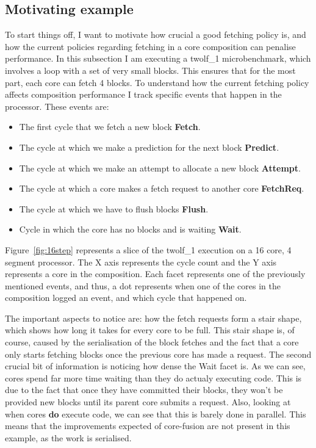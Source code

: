 \subsection{Motivating example}
To start things off, I want to motivate how crucial a good fetching policy is, and how the current policies regarding fetching in a core composition can penalise performance.
In this subsection I am executing a twolf\_1 microbenchmark, which involves a loop with a set of very small blocks. 
This ensures that for the most part, each core can fetch 4 blocks.
To understand how the current fetching policy affects composition performance I track specific events that happen in the processor.
These events are:
\begin{itemize}
\item The first cycle that we fetch a new block \textbf{Fetch}.
\item The cycle at which we make a prediction for the next block \textbf{Predict}.
\item The cycle at which we make an attempt to allocate a new block \textbf{Attempt}.
\item The cycle at which a core makes a fetch request to  another core \textbf{FetchReq}.
\item The cycle at which we have to flush blocks \textbf{Flush}.
\item Cycle in which the core has no blocks and is waiting \textbf{Wait}.
\end{itemize}
Figure~\ref{fig:16step} represents a slice of the twolf\_1 execution on a 16 core, 4 segment processor.
The X axis represents the cycle count and the Y axis represents a core in the composition.
Each facet represents one of the previously mentioned events, and thus, a dot represents when one of the cores in the composition logged an event, and which cycle that happened on.

The important aspects to notice are: how the fetch requests form a stair shape, which shows how long it takes for every core to be full.
This stair shape is, of course, caused by the serialisation of the block fetches and the fact that a core only starts fetching blocks once the previous core has made a request.
The second crucial bit of information is noticing how dense the Wait facet is.
As we can see, cores spend far more time waiting than they do actualy executing code.
This is due to the fact that once they have committed their blocks, they won't be provided new blocks until its parent core submits a request.
Also, looking at when cores \textbf{do} execute code, we can see that this is barely done in parallel. 
This means that the improvements expected of core-fusion are not present in this example, as the work is serialised.


